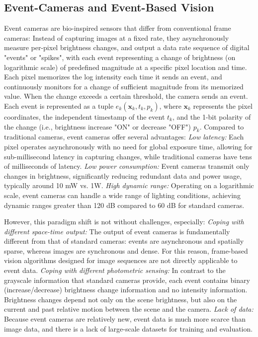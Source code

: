 \documentclass{article}
\begin{document}
\subsection{Event-Cameras and Event-Based Vision}
Event cameras are bio-inspired sensors that differ from conventional frame cameras: Instead of capturing images at a fixed rate, they asynchronously measure per-pixel brightness changes, and output a data rate sequence of digital "events" or "spikes", with each event representing a change of brightness (on logarithmic scale) of predefined magnitude at a specific pixel location and time. Each pixel memorizes the log intensity each time it sends an event, and continuously monitors for a change of sufficient magnitude from its memorized value. When the change exceeds a certain threshold, the camera sends an event. Each event is represented as a tuple $e_k(\textbf{x}_k,t_k,p_k)$,
where $\textbf{x}_k$ represents the pixel coordinates, the independent timestamp of the event $t_k$, and the 1-bit polarity of the change (i.e., brightness increase "ON" or decrease "OFF") $p_k$. Compared to traditional cameras, event cameras offer several advantages: \textit{Low latency:} Each pixel operates asynchronously with no need for global exposure time, allowing for sub-millisecond latency in capturing changes, while traditional cameras have tens of milliseconds of latency. \textit{Low power consumption:} Event cameras transmit only changes in brightness, significantly reducing redundant data and power usage, typically around 10 mW vs. 1W. \textit{High dynamic range:} Operating on a logarithmic scale, event cameras can handle a wide range of lighting conditions, achieving dynamic ranges greater than 120 dB compared to 60 dB for standard cameras. 

However, this paradigm shift is not without challenges, especially: \textit{Coping with different space-time output:} The output of event cameras is fundamentally different from that of standard cameras: events are asynchronous and spatially sparse, whereas images are synchronous and dense. For this reason, frame-based vision algorithms designed for image sequences are not directly applicable to event data. \textit{Coping with different photometric sensing:} In contrast to the grayscale information that standard cameras provide, each event contains binary (increase/decrease) brightness change information and no intensity information. Brightness changes depend not only on the scene brightness, but also on the current and past relative motion between the scene and the camera. \textit{Lack of data:} Because event cameras are relatively new, event data is much more scarce than image data, and there is a lack of large-scale datasets for training and evaluation. 
\end{document}
